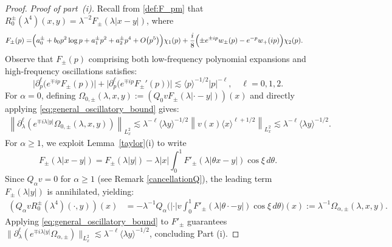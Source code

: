 \documentclass[reqno]{amsart}
\numberwithin{equation}{section}
\begin{document}
\begin{proof}
	\textit{Proof of part~{\rm (i)}.}
	Recall from \eqref{def:F_pm} that $R^\pm_0(\lambda^4)(x,y) = \lambda^{-2} F_\pm(\lambda|x-y|)$, where 
\begin{align}\label{Fpm}
	{F}_\pm(p)=&\Bigl(a_0^\pm+b_0p^2\log p+a_1^\pm p^2
	+a_2^\pm p^4+O\bigl(p^{5}\bigr)\Bigr)\chi_1(p)+\frac{i}{8}\Bigl(\pm e^{\pm ip} w_\pm(p)-e^{-p}w_+(ip)\Bigr)\chi_2(p).
\end{align}
Observe that $F_\pm(p)$ comprising both low-frequency polynomial expansions and high-frequency oscillations satisfies:
\[
\bigl|\partial_p^\ell \bigl(e^{\mp ip} F_\pm(p)\bigr)\bigr| + \bigl|\partial_p^\ell \bigl(e^{\mp ip} F_\pm'(p)\bigr)\bigr| \lesssim \langle p \rangle^{-1/2} |p|^{-\ell}, \quad \ell = 0,1,2.
\]
For $\alpha = 0$, defining $\Omega_{0,\pm}(\lambda,x,y) := \left(Q_0 v F_\pm(\lambda|\cdot-y|)\right)(x)$ and directly applying \eqref{eq:general_oscillatory_bound} gives:
\begin{align*}
	\left\| \partial_\lambda^\ell \left(e^{\mp i \lambda|y|} \Omega_{0,\pm}(\lambda, x, y)\right) \right\|_{L^2_x}
	\lesssim \lambda^{-\ell} \langle \lambda y \rangle^{-1/2} \left\| v(x) \langle x \rangle^{\ell+1/2} \right\|_{L^2_x} \lesssim \lambda^{-\ell} \langle \lambda y \rangle^{-1/2}.
\end{align*}
For $\alpha \ge 1$, we exploit Lemma~\ref{taylor}(i) to write $$F_\pm(\lambda|x-y|) = F_\pm(\lambda|y|) - \lambda |x| \int_0^1 F'_\pm(\lambda|\theta x-y|) \cos\xi \, d\theta.$$
Since $Q_\alpha v = 0$ for $\alpha \ge 1$ (see Remark \ref{cancellationQ}), the leading term $F_\pm(\lambda|y|)$ is annihilated, yielding:
\begin{align*}
	\left(Q_\alpha v R_0^{\pm}(\lambda^4)(\cdot, y)\right)(x)
	&= -\lambda^{-1} Q_\alpha \Big(|\cdot| v \int_0^1 F'_\pm(\lambda| \theta \cdot-y|)\cos\xi \, d\theta \Big)(x) := \lambda^{-1} \Omega_{\alpha,\pm}(\lambda, x, y).
\end{align*}
Applying \eqref{eq:general_oscillatory_bound} to $F'_\pm$ guarantees $\|\partial_\lambda^\ell (e^{\mp i \lambda|y|} \Omega_{\alpha,\pm})\|_{L^2_x} \lesssim \lambda^{-\ell} \langle \lambda y \rangle^{-1/2}$, concluding Part (i).

	\medskip
	

\end{proof}
\end{document}
